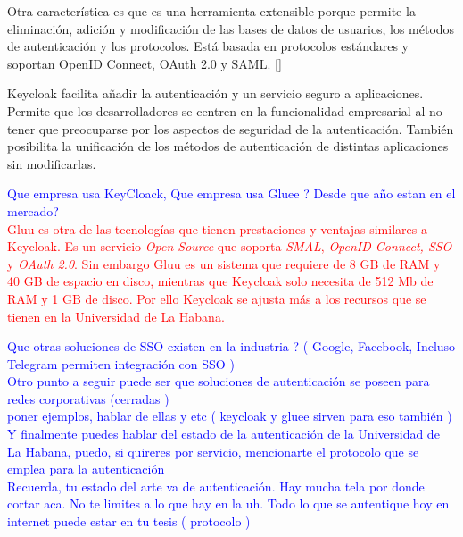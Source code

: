 	Otra característica es que es una herramienta extensible porque permite la eliminación, adición y modificación de las bases de datos de usuarios, los métodos de autenticación y los protocolos. Está basada en protocolos estándares y soportan OpenID Connect, OAuth 2.0 y SAML. [\cite{KeycloakDoc}]
	
	Keycloak facilita añadir la autenticación y un servicio seguro a aplicaciones. Permite que los desarrolladores se centren en la funcionalidad empresarial al no tener que preocuparse por los aspectos de seguridad de la autenticación. También posibilita la unificación de los métodos de autenticación de distintas aplicaciones sin modificarlas.
	
	\textcolor{blue}{Que empresa usa KeyCloack, Que empresa usa Gluee ? Desde que año estan en el mercado?}\\
	\textcolor{red}{Gluu es otra de las tecnologías que tienen prestaciones y ventajas similares a Keycloak. Es un servicio \textit{Open Source} que soporta \textit{SMAL}, \textit{OpenID Connect, SSO} y \textit{OAuth 2.0}. Sin embargo Gluu es un sistema que requiere de 8 GB de RAM y 40 GB de espacio en disco, mientras que Keycloak solo necesita de 512 Mb de RAM y 1 GB de disco. Por ello Keycloak se ajusta más a los recursos que se tienen en la Universidad de La Habana.}
	
	
	\textcolor{blue}{Que otras soluciones de SSO existen en la industria ? ( Google, Facebook, Incluso Telegram permiten integración con SSO )}
	\\
	\textcolor{blue}{Otro punto a seguir puede ser que soluciones de autenticación se poseen para redes corporativas  (cerradas )\\
	poner ejemplos, hablar de ellas y etc ( keycloak y gluee sirven para eso también )}
	\\
	\textcolor{blue}{Y finalmente puedes hablar del estado de la autenticación de la Universidad de La Habana, puedo, si quireres por servicio, mencionarte el protocolo que se emplea para la autenticación}
	\\
	\textcolor{blue}{Recuerda, tu estado del arte va de autenticación. Hay mucha tela por donde cortar aca. No te limites a lo que hay en la uh. Todo lo que se autentique hoy en internet puede estar en tu tesis ( protocolo )}
	

